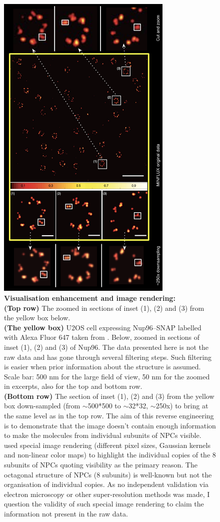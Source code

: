 \documentclass[9pt,twocolumn,twoside]{pnas-new}
\begin{document}
\begin{figure}[!ht]
\begin{center}
\includegraphics[width=8.4cm]{Figures/NPC1}
\end{center}
\caption[]{\textbf{Visualisation enhancement and image rendering:} \\
\textbf{(Top row)} The zoomed in sections of inset (1), (2) and (3) from the yellow box below.\\
\textbf{(The yellow box)} U2OS cell expressing Nup96–SNAP labelled with Alexa Fluor 647 taken from \cite{gwosch2020minflux}. Below, zoomed in sections of inset (1), (2) and (3) of Nup96. The data presented here is not the raw data and has gone through several filtering steps. Such filtering is easier when prior information about the structure is assumed. Scale bar: 500 nm for the large field of view, 50 nm for the zoomed in excerpts, also for the top and bottom row. \\
\textbf{(Bottom row)} The section of inset (1), (2) and (3) from the yellow box down-sampled (from $\sim$500*500 to $\sim$32*32, $\sim$250x) to bring at the same level as in the top row. The aim of this reverse engineering is to demonstrate that the image doesn't contain enough information to make the molecules from individual subunits of NPCs visible.\\
\cite{gwosch2020minflux} used special image rendering (different pixel sizes, Gaussian kernels and non-linear color maps) to highlight the individual copies of the 8 subunits of NPCs quoting visibility as the primary reason. The octagonal structure of NPCs (8 subunits) is well-known but not the organisation of individual copies. As no independent validation via electron microscopy or other super-resolution methods was made, I question the validity of such special image rendering to claim the information not present in the raw data. 
} \label{fig:npcs1}
\end{figure}
\end{document}
